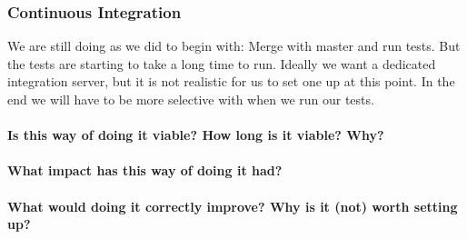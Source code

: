 \subsubsection{Continuous Integration}
We are still doing as we did to begin with: Merge with master and run tests. But the tests are starting to take a long time to run. Ideally we want a dedicated integration server, but it is not realistic for us to set one up at this point. In the end we will have to be more selective with when we run our tests.

\paragraph{Is this way of doing it viable? How long is it viable? Why?}

\paragraph{What impact has this way of doing it had?}

\paragraph{What would doing it correctly improve? Why is it (not) worth setting up?}

\pagebreak